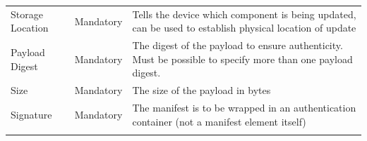 \documentclass[0-thesis.tex]{subfiles}
\begin{document}
\begin{longtable}[]{@{}lll@{}}
    \begin{minipage}[t]{0.23\columnwidth}\raggedright\strut
    Storage Location\strut
    \end{minipage} & \begin{minipage}[t]{0.26\columnwidth}\raggedright\strut
    Mandatory\strut
    \end{minipage} & \begin{minipage}[t]{0.42\columnwidth}\raggedright\strut
    Tells the device which component is being updated, can be used to
    establish physical location of update\strut
    \end{minipage}\tabularnewline
    \begin{minipage}[t]{0.23\columnwidth}\raggedright\strut
    Payload Digest\strut
    \end{minipage} & \begin{minipage}[t]{0.26\columnwidth}\raggedright\strut
    Mandatory\strut
    \end{minipage} & \begin{minipage}[t]{0.42\columnwidth}\raggedright\strut
    The digest of the payload to ensure authenticity. Must be possible to
    specify more than one payload digest.\strut
    \end{minipage}\tabularnewline
    \begin{minipage}[t]{0.23\columnwidth}\raggedright\strut
    Size\strut
    \end{minipage} & \begin{minipage}[t]{0.26\columnwidth}\raggedright\strut
    Mandatory\strut
    \end{minipage} & \begin{minipage}[t]{0.42\columnwidth}\raggedright\strut
    The size of the payload in bytes\strut
    \end{minipage}\tabularnewline
    \begin{minipage}[t]{0.23\columnwidth}\raggedright\strut
    Signature\strut
    \end{minipage} & \begin{minipage}[t]{0.26\columnwidth}\raggedright\strut
    Mandatory\strut
    \end{minipage} & \begin{minipage}[t]{0.42\columnwidth}\raggedright\strut
    The manifest is to be wrapped in an authentication container (not a
    manifest element itself)\strut
    \end{minipage}\tabularnewline
    \begin{minipage}[t]{0.23\columnwidth}\raggedright\strut

\end{minipage}
\end{longtable}
\end{document}
